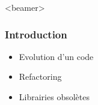 \begin{frame}<beamer>
\frametitle{Introduction}
\begin{itemize}
	\item Evolution d'un code
	\item Refactoring
	\item Librairies obsolètes
\end{itemize}
\end{frame}



